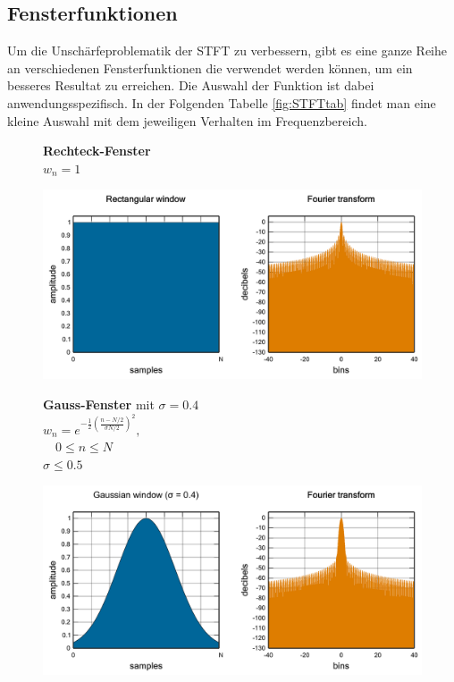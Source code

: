 \subsection{Fensterfunktionen}
Um die Unschärfeproblematik der STFT zu verbessern, gibt es eine ganze Reihe an verschiedenen Fensterfunktionen die verwendet werden können, um ein besseres Resultat zu erreichen. Die Auswahl der Funktion ist dabei anwendungsspezifisch. In der Folgenden Tabelle \ref{fig:STFTtab} findet man eine kleine Auswahl mit dem jeweiligen Verhalten im Frequenzbereich. 


\begin{figure}[!ht]
	\begin{minipage}{.4\columnwidth}
		\textbf{Rechteck-Fenster}\\
		$w_{n}=1$
	\end{minipage}%
	\begin{minipage}{.6\columnwidth}
		\centering
		\includegraphics[width=\linewidth]{papers/autotune/sections/fft/images/windows/Rectangular.pdf}
	\end{minipage}


	\begin{minipage}{.4\columnwidth}
		\textbf{Gauss-Fenster} mit $\sigma = 0.4$\\
		$w_{n}=e^{-\frac{1}{2}\left(\frac{n-N / 2}{\sigma N / 2}\right)^{2}},$\\
		$ \quad 0 \leq n \leq N$\\
		$\sigma \leq 0.5$
	\end{minipage}%
	\begin{minipage}{.6\columnwidth}
		\centering
		\includegraphics[width=\linewidth]{papers/autotune/sections/fft/images/windows/Gauss.pdf}
	\end{minipage}



\end{figure}
